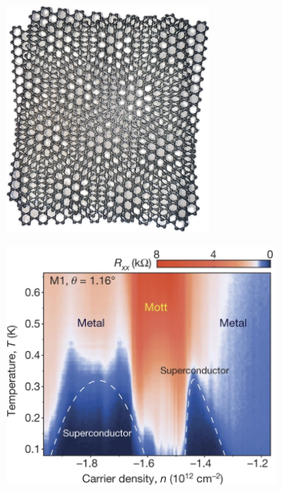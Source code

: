 \documentclass[../main.tex]{subfiles}
\begin{document}
\begin{figure}[tb]
	\begin{subfigure}[b]{0.5\textwidth}
		\centering
		\caption{\hfill\null}\label{sfig:3D printed twisted graphene}
		\includegraphics[width=0.75\textwidth]{images/Twisted 3D printed graphene small.png}
	\end{subfigure}%
	\begin{subfigure}[b]{0.5\textwidth}
		\centering
		\caption{\hfill\null}\label{sfig:unconventional SC MATBG}
		\includegraphics[width=1.0\textwidth]{images/cao_unvoncentional_SC_MATBG.png}

\end{subfigure}
\end{figure}
\end{document}
